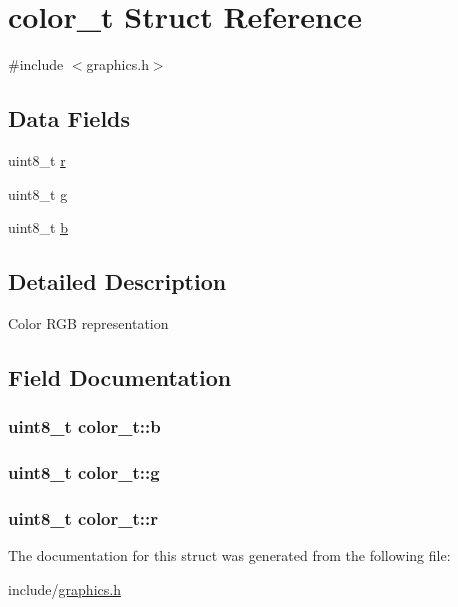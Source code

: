 \hypertarget{structcolor__t}{}\section{color\+\_\+t Struct Reference}
\label{structcolor__t}


{\ttfamily \#include $<$graphics.\+h$>$}

\subsection*{Data Fields}
\begin{DoxyCompactItemize}
\item 
uint8\+\_\+t \hyperlink{structcolor__t_a9138f903c9036862cfeab970b156b62d}{r}
\item 
uint8\+\_\+t \hyperlink{structcolor__t_a7d1a9e3552401fc5f8882f6e0c2c82aa}{g}
\item 
uint8\+\_\+t \hyperlink{structcolor__t_a83c6c6015c8a0bf9e120dd88caf13bcd}{b}
\end{DoxyCompactItemize}


\subsection{Detailed Description}
Color R\+GB representation 

\subsection{Field Documentation}
\subsubsection[{\texorpdfstring{b}{b}}]{\setlength{\rightskip}{0pt plus 5cm}uint8\+\_\+t color\+\_\+t\+::b}\hypertarget{structcolor__t_a83c6c6015c8a0bf9e120dd88caf13bcd}{}\label{structcolor__t_a83c6c6015c8a0bf9e120dd88caf13bcd}
\subsubsection[{\texorpdfstring{g}{g}}]{\setlength{\rightskip}{0pt plus 5cm}uint8\+\_\+t color\+\_\+t\+::g}\hypertarget{structcolor__t_a7d1a9e3552401fc5f8882f6e0c2c82aa}{}\label{structcolor__t_a7d1a9e3552401fc5f8882f6e0c2c82aa}
\subsubsection[{\texorpdfstring{r}{r}}]{\setlength{\rightskip}{0pt plus 5cm}uint8\+\_\+t color\+\_\+t\+::r}\hypertarget{structcolor__t_a9138f903c9036862cfeab970b156b62d}{}\label{structcolor__t_a9138f903c9036862cfeab970b156b62d}


The documentation for this struct was generated from the following file\+:\begin{DoxyCompactItemize}
\item 
include/\hyperlink{graphics_8h}{graphics.\+h}\end{DoxyCompactItemize}
